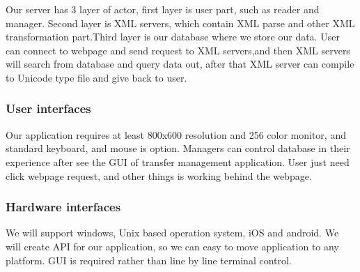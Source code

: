 Our server has 3 layer of actor, first layer is user part, such as reader and manager. 
Second layer is XML servers, which contain XML parse and other XML transformation part.Third layer is our database where we store our data. 
User can connect to webpage and send request to XML servers,and then XML servers will search from database and query data out, after that XML server can compile to Unicode type file and give back to user.



\subsubsection{User interfaces}
Our application requires at least 800x600 resolution and 256 color monitor, and standard keyboard, and mouse is option.
Managers can control database in their experience after see the GUI of transfer management application.
User just need click webpage request, and other things is working behind the webpage.


\subsubsection{Hardware interfaces}
We will support windows, Unix based operation  system, iOS and android.
We will create API for our application, so we can easy to move application to any platform.
GUI is required rather than line by line terminal control.

